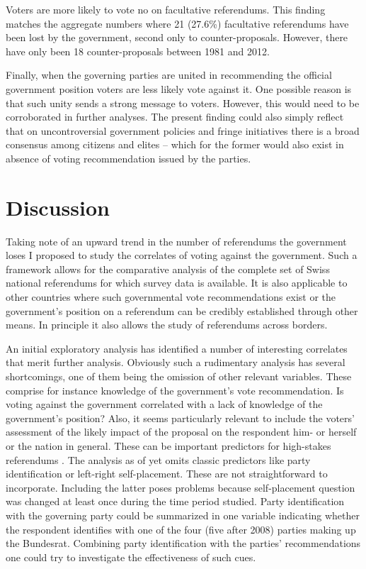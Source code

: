 \documentclass[11pt,a4paper]{article}\usepackage[]{graphicx}\usepackage[]{color}
\begin{document}
    Voters are more likely to vote no on facultative referendums. This finding matches the aggregate numbers where 21 (27.6\%) facultative referendums have been lost by the government, second only to counter-proposals. However, there have only been 18 counter-proposals between 1981 and 2012.
    
    Finally, when the governing parties are united in recommending the official government position voters are less likely vote against it. One possible reason is that such unity sends a strong message to voters. However, this would need to be corroborated in further analyses. The present finding could also simply reflect that on uncontroversial government policies and fringe initiatives there is a broad consensus among citizens and elites -- which for the former would also exist in absence of voting recommendation issued by the parties. 
    
    \section{Discussion}\label{sec:discussion}
    
    
    Taking note of an upward trend in the number of referendums the government loses I proposed to study the correlates of voting against the government. Such a framework allows for the comparative analysis of the complete set of Swiss national referendums for which survey data is available. It is also applicable to other countries where such governmental vote recommendations exist or the government's position on a referendum can be credibly established through other means. In principle it also allows the study of referendums across borders. 
    
    An initial exploratory analysis has identified a number of interesting correlates that merit further analysis. Obviously such a rudimentary analysis has several shortcomings, one of them being the omission of other relevant variables. %
    These comprise for instance knowledge of the government's vote recommendation. Is voting against the government correlated with a lack of knowledge of the government's position? Also, it seems particularly relevant to include the voters' assessment of the likely impact of the proposal on the respondent him- or herself or the nation in general. These can be important predictors for high-stakes referendums \citep{nadeau_attitude_1999}. The analysis as of yet omits classic predictors like party identification or left-right self-placement. These are not straightforward to incorporate. Including the latter poses problems because self-placement question was changed at least once during the time period studied. Party identification with the governing party could be summarized in one variable indicating whether the respondent identifies with one of the four (five after 2008) parties making up the Bundesrat. Combining party identification with the parties' recommendations one could try to investigate the effectiveness of such cues. 
    
\end{document}
